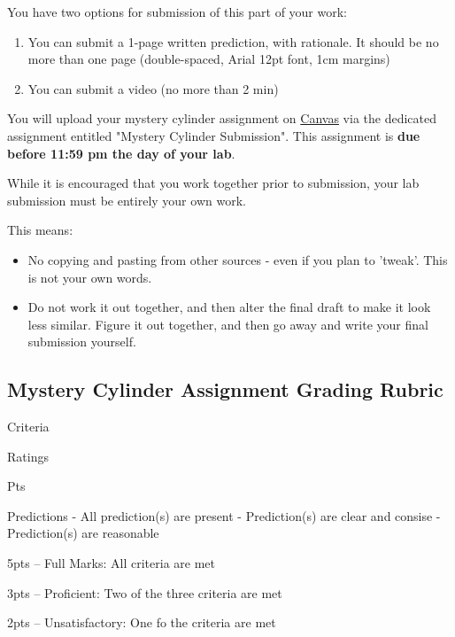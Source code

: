 \documentclass[
]{book}
\providecommand{\tightlist}{%
  \setlength{\itemsep}{0pt}\setlength{\parskip}{0pt}}
\begin{document}
You have two options for submission of this part of your work:

\begin{enumerate}
\def\labelenumi{\arabic{enumi}.}
\tightlist
\item
  You can submit a 1-page written prediction, with rationale. It should be no more than one page (double-spaced, Arial 12pt font, 1cm margins)
\item
  You can submit a video (no more than 2 min)
\end{enumerate}

You will upload your mystery cylinder assignment on \href{https://canvas.ubc.ca}{Canvas} via the dedicated assignment entitled "Mystery Cylinder Submission". This assignment is \textbf{due before 11:59 pm the day of your lab}.

While it is encouraged that you work together prior to submission, your lab submission must be entirely your own work.

This means:

\begin{itemize}
\tightlist
\item
  No copying and pasting from other sources - even if you plan to 'tweak'. This is not your own words.
\item
  Do not work it out together, and then alter the final draft to make it look less similar. Figure it out together, and then go away and write your final submission yourself.
\end{itemize}

\hypertarget{mystery-cylinder-assignment-grading-rubric}{%
\subsection*{Mystery Cylinder Assignment Grading Rubric}\label{mystery-cylinder-assignment-grading-rubric}}

Criteria

Ratings

Pts

Predictions
- All prediction(s) are present
- Prediction(s) are clear and consise
- Prediction(s) are reasonable

5pts -- Full Marks: All criteria are met

3pts -- Proficient: Two of the three criteria are met

2pts -- Unsatisfactory: One fo the criteria are met
\end{document}
